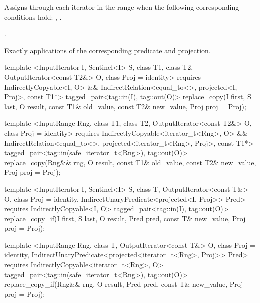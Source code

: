 \begin{itemdescr}
\pnum
\effects
Assigns  through each iterator
in the range 
when the following corresponding conditions hold:
,
.

\pnum
\returns
{}.

\pnum
\complexity
Exactly
applications of the corresponding predicate and projection.
\end{itemdescr}

%
%
\begin{itemdecl}
template <InputIterator I, Sentinel<I> S, class T1, class T2, OutputIterator<const T2&> O,
    class Proj = identity>
  requires IndirectlyCopyable<I, O> &&
    IndirectRelation<equal_to<>, projected<I, Proj>, const T1*>
  tagged_pair<tag::in(I), tag::out(O)>
    replace_copy(I first, S last, O result, const T1& old_value, const T2& new_value,
                 Proj proj = Proj{});

template <InputRange Rng, class T1, class T2, OutputIterator<const T2&> O,
    class Proj = identity>
  requires IndirectlyCopyable<iterator_t<Rng>, O> &&
    IndirectRelation<equal_to<>, projected<iterator_t<Rng>, Proj>, const T1*>
  tagged_pair<tag::in(safe_iterator_t<Rng>), tag::out(O)>
    replace_copy(Rng&& rng, O result, const T1& old_value, const T2& new_value,
                 Proj proj = Proj{});

template <InputIterator I, Sentinel<I> S, class T, OutputIterator<const T&> O,
    class Proj = identity, IndirectUnaryPredicate<projected<I, Proj>> Pred>
  requires IndirectlyCopyable<I, O>
  tagged_pair<tag::in(I), tag::out(O)>
    replace_copy_if(I first, S last, O result, Pred pred, const T& new_value,
                    Proj proj = Proj{});

template <InputRange Rng, class T, OutputIterator<const T&> O, class Proj = identity,
    IndirectUnaryPredicate<projected<iterator_t<Rng>, Proj>> Pred>
  requires IndirectlyCopyable<iterator_t<Rng>, O>
  tagged_pair<tag::in(safe_iterator_t<Rng>), tag::out(O)>
    replace_copy_if(Rng&& rng, O result, Pred pred, const T& new_value,
                    Proj proj = Proj{});
\end{itemdecl}


